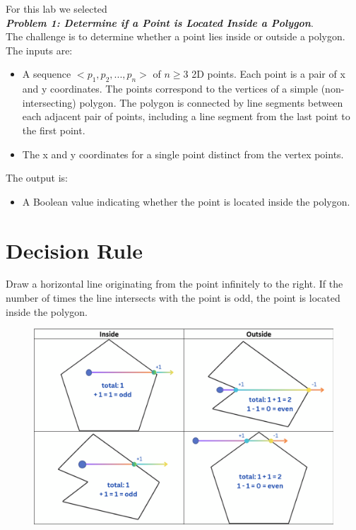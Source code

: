 \documentclass{labReport}
\begin{document}
\newpage
\begin{multicols*}{2}
\raggedcolumns

For this lab we selected \\\textit{\textbf{Problem 1: Determine if a Point is Located Inside a Polygon}}.\\ The challenge is to determine whether a point lies inside or outside a polygon. The inputs are:
\begin{itemize}
    \item A sequence $<p_1, p_2, ..., p_n>$ of $n \geq 3$ 2D points.  Each point is a pair of x and y coordinates.  The points correspond to the vertices of a simple (non-intersecting) polygon.  The polygon is connected by line segments between each adjacent pair of points, including a line segment from the last point to the first point.
    \item The x and y coordinates for a single point distinct from the vertex points.
\end{itemize}
The output is:
\begin{itemize}
    \item A Boolean value indicating whether the point is located inside the polygon.
\end{itemize}

\section{Decision Rule}

Draw a horizontal line originating from the point infinitely to the right. 
If the number of times the line intersects with the point is odd, the point is located inside the polygon.

\begin{figure}
     \centering
     \includegraphics[width=1\linewidth]{images/decision_boundary.png}
\end{figure} 


\end{multicols*}
\end{document}
